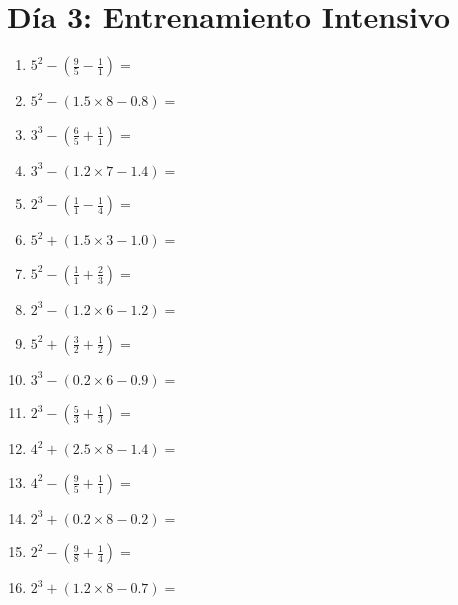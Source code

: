 \documentclass[12pt]{article}
\begin{document}
\section*{Día 3: Entrenamiento Intensivo}
\begin{enumerate}
\item \large $ 5^{2} - (\frac{9}{5} - \frac{1}{1}) = $ \vspace{1.6cm}
\item \large $ 5^{2} - (1.5 \times 8 - 0.8) = $ \vspace{1.6cm}
\item \large $ 3^{3} - (\frac{6}{5} + \frac{1}{1}) = $ \vspace{1.6cm}
\item \large $ 3^{3} - (1.2 \times 7 - 1.4) = $ \vspace{1.6cm}
\item \large $ 2^{3} - (\frac{1}{1} - \frac{1}{4}) = $ \vspace{1.6cm}
\item \large $ 5^{2} + (1.5 \times 3 - 1.0) = $ \vspace{1.6cm}
\item \large $ 5^{2} - (\frac{1}{1} + \frac{2}{3}) = $ \vspace{1.6cm}
\item \large $ 2^{3} - (1.2 \times 6 - 1.2) = $ \vspace{1.6cm}
\item \large $ 5^{2} + (\frac{3}{2} + \frac{1}{2}) = $ \vspace{1.6cm}
\item \large $ 3^{3} - (0.2 \times 6 - 0.9) = $ \vspace{1.6cm}
\newpage
\item \large $ 2^{3} - (\frac{5}{3} + \frac{1}{3}) = $ \vspace{1.6cm}
\item \large $ 4^{2} + (2.5 \times 8 - 1.4) = $ \vspace{1.6cm}
\item \large $ 4^{2} - (\frac{9}{5} + \frac{1}{1}) = $ \vspace{1.6cm}
\item \large $ 2^{3} + (0.2 \times 8 - 0.2) = $ \vspace{1.6cm}
\item \large $ 2^{2} - (\frac{9}{8} + \frac{1}{4}) = $ \vspace{1.6cm}
\item \large $ 2^{3} + (1.2 \times 8 - 0.7) = $ \vspace{1.6cm}

\end{enumerate}
\end{document}
